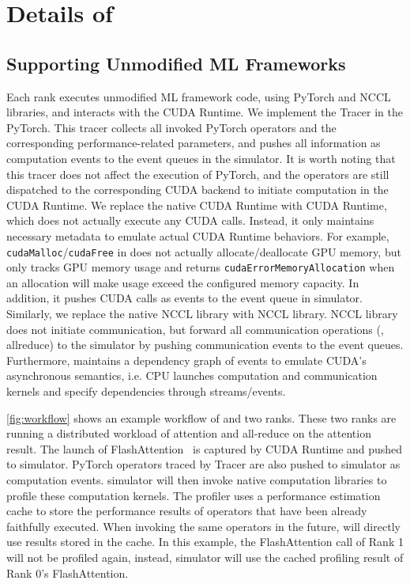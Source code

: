 \section{Details of \sys}

\subsection{Supporting Unmodified ML Frameworks}
\label{sec:workflow}


Each rank executes unmodified ML framework code, using PyTorch and NCCL libraries, and interacts with the CUDA Runtime. We implement the \sys Tracer in the PyTorch. This tracer collects all invoked PyTorch operators and the corresponding performance-related parameters, and pushes all information as computation events to the event queues in the \sys simulator. It is worth noting that this tracer does not affect the execution of PyTorch, and the operators are still dispatched to the corresponding CUDA backend to initiate computation in the CUDA Runtime. We replace the native CUDA Runtime with \sys CUDA Runtime, which does not actually execute any CUDA calls. Instead, it only maintains necessary metadata to emulate actual CUDA Runtime behaviors. For example, \texttt{cudaMalloc}/\texttt{cudaFree} in \sys does not actually allocate/deallocate GPU memory, but only tracks GPU memory usage and returns \texttt{cudaErrorMemoryAllocation} when an allocation will make usage exceed the configured memory capacity. In addition, it pushes CUDA calls as events to the event queue in \sys simulator. Similarly, we replace the native NCCL library with \sys NCCL library. \sys NCCL library does not initiate communication, but forward all communication operations (\eg, allreduce) to the simulator by pushing communication events to the event queues. Furthermore, \sys maintains a dependency graph of events to emulate CUDA's asynchronous semantics, i.e. CPU launches computation and communication kernels and specify dependencies through streams/events.

\autoref{fig:workflow} shows an example workflow of \sys and two ranks. These two ranks are running a distributed workload of attention and all-reduce on the attention result. The launch of FlashAttention~\cite{dao2022flashattention,dao2023flashattention2} is captured by \sys CUDA Runtime and pushed to \sys simulator. PyTorch operators traced by \sys Tracer are also pushed to \sys simulator as computation events. \sys simulator will then invoke native computation libraries to profile these computation kernels. The profiler uses a performance estimation cache to store the performance results of operators that have been already faithfully executed. When invoking the same operators in the future, \sys will directly use results stored in the cache. In this example, the FlashAttention call of Rank 1 will not be profiled again, instead, \sys simulator will use the cached profiling result of Rank 0's FlashAttention.

